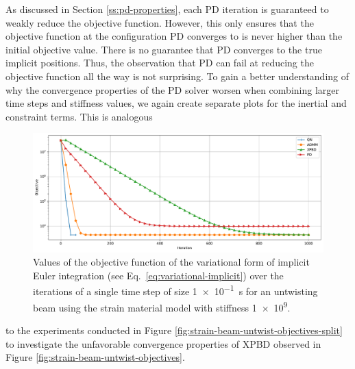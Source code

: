 As discussed in Section \ref{ss:pd-properties}, each PD iteration is guaranteed to weakly reduce the objective function. However, this only ensures that the objective function 
at the configuration PD converges to is never higher than the initial objective value. There is no guarantee that 
PD converges to the true implicit positions. Thus, the observation that PD can fail at reducing the objective function all the way is not surprising. To gain a better 
understanding of why the convergence properties of the PD solver worsen when combining larger time steps and stiffness values, we again create separate plots for the 
inertial and constraint terms. This is analogous 

\begin{figure}[h]
    \includegraphics[width=\textwidth]{figures/strain_beam_untwist_objectives_large_ts.pdf}
    \caption{Values of the objective function of the variational form of implicit Euler integration (see Eq.\ \ref{eq:variational-implicit}) over the iterations of a single time 
        step of size \SI{1e-1}{\second} for an untwisting beam using the strain material model with stiffness \num{1e9}.}
    \label{fig:strain-beam-untwist-objectives-large-ts}
\end{figure}

\noindent
to the experiments conducted in Figure \ref{fig:strain-beam-untwist-objectives-split} to investigate 
the unfavorable convergence properties of XPBD observed in Figure \ref{fig:strain-beam-untwist-objectives}. 

